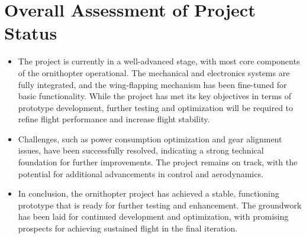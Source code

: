 \section{Overall Assessment of Project Status}
\begin{itemize}
    \item The project is currently in a well-advanced stage, with most core components of the ornithopter operational. The mechanical and electronics systems are fully integrated, and the wing-flapping mechanism has been fine-tuned for basic functionality. While the project has met its key objectives in terms of prototype development, further testing and optimization will be required to refine flight performance and increase flight stability.
    
    \item Challenges, such as power consumption optimization and gear alignment issues, have been successfully resolved, indicating a strong technical foundation for further improvements. The project remains on track, with the potential for additional advancements in control and aerodynamics.
    
    \item In conclusion, the ornithopter project has achieved a stable, functioning prototype that is ready for further testing and enhancement. The groundwork has been laid for continued development and optimization, with promising prospects for achieving sustained flight in the final iteration.
\end{itemize}